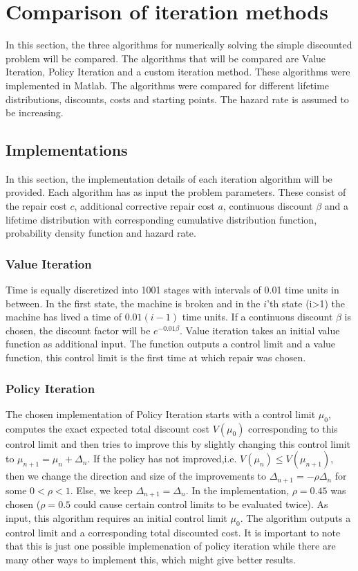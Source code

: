 


\chapter{Comparison of iteration methods}
In this section, the three algorithms for numerically solving the simple discounted problem will be compared.
The algorithms that will be compared are Value Iteration, Policy Iteration and a custom iteration method.
These algorithms were implemented in Matlab.
The algorithms were compared for different lifetime distributions, discounts, costs and starting points.
The hazard rate is assumed to be increasing.
\section{Implementations}
In this section, the implementation details of each iteration algorithm will be provided.
Each algorithm has as input the problem parameters.
These consist of the repair cost $c$, additional corrective repair cost $a$, continuous discount $\beta$ and a lifetime distribution with corresponding cumulative distribution function, probability density function and hazard rate.
\subsection{Value Iteration}
Time is equally discretized into 1001 stages with intervals of 0.01 time units in between.
In the first state, the machine is broken and in the $i$'th state (i>1) the machine has lived a time of $0.01(i-1)$ time units.
If a continuous discount $\beta$ is chosen, the discount factor will be $e^{-0.01\beta}$.
Value iteration takes an initial value function as additional input.
The function outputs a control limit and a value function, this control limit is the first time at which repair was chosen.

\subsection{Policy Iteration}
The chosen implementation of Policy Iteration starts with a control limit $\mu_0$, computes the exact expected total discount cost $V(\mu_0)$ corresponding to this control limit and then tries to improve this by slightly changing this control limit to $\mu_{n+1}=\mu_n+\Delta_n$.
If the policy has not improved,i.e. $V(\mu_n)\leq V(\mu_{n+1})$, then we change the direction and size of the improvements to $\Delta_{n+1}=-\rho\Delta_n$ for some $0<\rho<1$.
Else, we keep $\Delta_{n+1}=\Delta_n$.
In the implementation, $\rho=0.45$ was chosen ($\rho=0.5$ could cause certain control limits to be evaluated twice).
As input, this algorithm requires an initial control limit $\mu_0$.
The algorithm outputs a control limit and a corresponding total discounted cost.
It is important to note that this is just one possible implemenation of policy iteration while there are many other ways to implement this, which might give better results.

